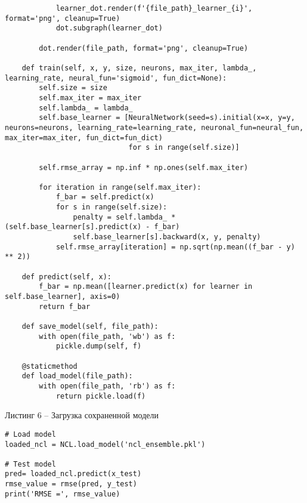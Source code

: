 \documentclass[12pt]{extarticle}
\begin{document}
\begin{lstlisting} 
            learner_dot.render(f'{file_path}_learner_{i}', format='png', cleanup=True)
            dot.subgraph(learner_dot)

        dot.render(file_path, format='png', cleanup=True)
    
    def train(self, x, y, size, neurons, max_iter, lambda_, learning_rate, neural_fun='sigmoid', fun_dict=None):
        self.size = size
        self.max_iter = max_iter
        self.lambda_ = lambda_
        self.base_learner = [NeuralNetwork(seed=s).initial(x=x, y=y, neurons=neurons, learning_rate=learning_rate, neuronal_fun=neural_fun, max_iter=max_iter, fun_dict=fun_dict)
                             for s in range(self.size)]

        self.rmse_array = np.inf * np.ones(self.max_iter)

        for iteration in range(self.max_iter):
            f_bar = self.predict(x)
            for s in range(self.size):
                penalty = self.lambda_ * (self.base_learner[s].predict(x) - f_bar)
                self.base_learner[s].backward(x, y, penalty)
            self.rmse_array[iteration] = np.sqrt(np.mean((f_bar - y) ** 2))

    def predict(self, x):
        f_bar = np.mean([learner.predict(x) for learner in self.base_learner], axis=0)
        return f_bar

    def save_model(self, file_path):
        with open(file_path, 'wb') as f:
            pickle.dump(self, f)

    @staticmethod
    def load_model(file_path):
        with open(file_path, 'rb') as f:
            return pickle.load(f)
\end{lstlisting}

\newpage

Листинг 6 -- Загрузка сохраненной модели

\begin{lstlisting}
# Load model
loaded_ncl = NCL.load_model('ncl_ensemble.pkl')

# Test model
pred= loaded_ncl.predict(x_test)
rmse_value = rmse(pred, y_test)
print('RMSE =', rmse_value)
\end{lstlisting}
\end{document}
